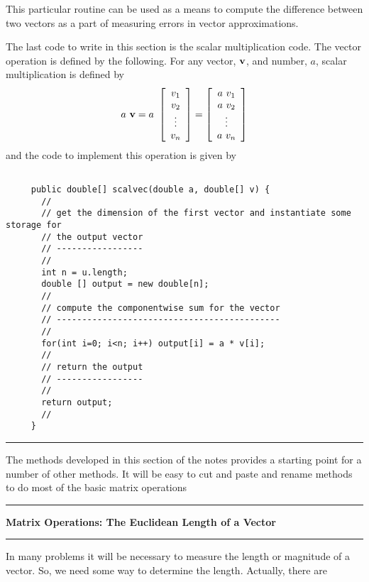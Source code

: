 \documentclass[10pt,fleqn]{article}
\begin{document}
This particular routine can be used as a means to compute the difference between
two vectors as a part of measuring errors in vector approximations.

The last code to write in this section is the scalar multiplication code. The
vector operation is defined by the following. For any vector, ${\bf v}$, and
number, $a$, scalar multiplication is defined by
$$
  a\ {\bf v} = 
       a\ \left[
            \begin{array}{c}
              v_1 \\
              v_2 \\
              \vdots \\
              v_n
            \end{array}
          \right]
     = \left[
         \begin{array}{c}
           a\ v_1 \\
           a\ v_2 \\
           \vdots \\
           a\ v_n
         \end{array}
       \right]
$$
and the code to implement this operation is given by
\begin{verbatim}

     public double[] scalvec(double a, double[] v) {
       //
       // get the dimension of the first vector and instantiate some storage for
       // the output vector
       // -----------------
       //
       int n = u.length;
       double [] output = new double[n];
       //
       // compute the componentwise sum for the vector
       // --------------------------------------------
       //
       for(int i=0; i<n; i++) output[i] = a * v[i];
       //
       // return the output
       // -----------------
       //
       return output;
       //
     }

\end{verbatim}
\vskip0.1in\hrule\vskip0.1in
The methods developed in this section of the notes provides a starting point for
a number of other methods. It will be easy to cut and paste and rename methods
to do most of the basic matrix operations
\newpage
\vskip0.1in\hrule\vskip0.1in
\noindent
{\bf Matrix Operations: The Euclidean Length of a Vector}
\vskip0.1in\hrule\vskip0.1in
\noindent
In many problems it will be necessary to measure the length or magnitude of a
vector. So, we need some way to determine the length. Actually, there are
\end{document}
